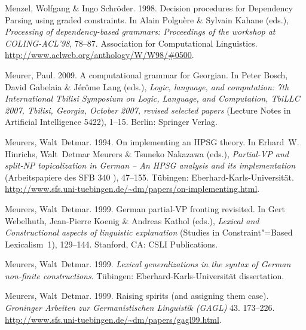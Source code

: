 \begin{thebibliography}{1420}
Menzel, Wolfgang \& Ingo Schr{\"o}der. 1998{}.
\newblock Decision procedures for {Dependency Parsing} using graded
  constraints.
\newblock In Alain Polgu{\`e}re \& Sylvain Kahane (eds.), \emph{Processing of
  dependency-based grammars: {Proceedings} of the workshop at {COLING-ACL}'98},
  78--87. Association for Computational Linguistics.
\newblock \urlprefix\url{http://www.aclweb.org/anthology/W/W98/#0500}.

Meurer, Paul. 2009.
\newblock A computational grammar for {Georgian}.
\newblock In Peter Bosch, David Gabelaia \& J{\'e}r{\^o}me Lang (eds.),
  \emph{Logic, language, and computation: 7th {International Tbilisi Symposium
  on Logic, Language, and Computation, TbiLLC 2007, Tbilisi, Georgia, October
  2007}, revised selected papers} (Lecture Notes in Artificial Intelligence
  5422), 1--15. Berlin: Springer Verlag.

Meurers, Walt~Detmar. 1994.
\newblock On implementing an {HPSG} theory.
\newblock In Erhard~W. Hinrichs, Walt~Detmar Meurers \& Tsuneko Nakazawa
  (eds.), \emph{{Partial-VP} and split-{NP} topicalization in {German} -- {An}
  {HPSG} analysis and its implementation} (Arbeitspapiere des SFB 340 ),
  47--155. T{\"u}bingen: Eberhard-Karls-Uni\-ver\-si\-t{\"a}t.
\newblock
  \urlprefix\url{http://www.sfs.uni-tuebingen.de/~dm/papers/on-implementing.html}.

Meurers, Walt~Detmar. 1999{}.
\newblock German partial-{VP} fronting revisited.
\newblock In Gert Webelhuth, Jean-Pierre Koenig \& Andreas Kathol (eds.),
  \emph{Lexical and {Constructional} aspects of linguistic explanation}
  (Studies in Constraint"=Based Lexicalism~1), 129--144. Stanford, CA: CSLI
  Publications.

Meurers, Walt~Detmar. 1999{}.
\newblock \emph{Lexical generalizations in the syntax of {German} non-finite
  constructions}.
\newblock T{\"u}bingen: Eberhard-Karls-Uni\-ver\-si\-t{\"a}t dissertation.

Meurers, Walt~Detmar. 1999{}.
\newblock Raising spirits (and assigning them case).
\newblock \emph{Groninger Arbeiten zur Germanistischen Linguistik (GAGL)} 43.
  173--226.
\newblock
  \urlprefix\url{http://www.sfs.uni-tuebingen.de/~dm/papers/gagl99.html}.


\end{thebibliography}
